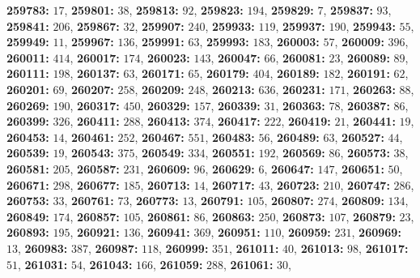 \textsf{\bfseries 259783:} $17$, \textsf{\bfseries 259801:} $38$, \textsf{\bfseries 259813:} $92$, \textsf{\bfseries 259823:} $194$, \textsf{\bfseries 259829:} $7$, \textsf{\bfseries 259837:} $93$, \textsf{\bfseries 259841:} $206$, \textsf{\bfseries 259867:} $32$, \textsf{\bfseries 259907:} $240$, \textsf{\bfseries 259933:} $119$, \textsf{\bfseries 259937:} $190$, \textsf{\bfseries 259943:} $55$, \textsf{\bfseries 259949:} $11$, \textsf{\bfseries 259967:} $136$, \textsf{\bfseries 259991:} $63$, \textsf{\bfseries 259993:} $183$, \textsf{\bfseries 260003:} $57$, \textsf{\bfseries 260009:} $396$, \textsf{\bfseries 260011:} $414$, \textsf{\bfseries 260017:} $174$, \textsf{\bfseries 260023:} $143$, \textsf{\bfseries 260047:} $66$, \textsf{\bfseries 260081:} $23$, \textsf{\bfseries 260089:} $89$, \textsf{\bfseries 260111:} $198$, \textsf{\bfseries 260137:} $63$, \textsf{\bfseries 260171:} $65$, \textsf{\bfseries 260179:} $404$, \textsf{\bfseries 260189:} $182$, \textsf{\bfseries 260191:} $62$, \textsf{\bfseries 260201:} $69$, \textsf{\bfseries 260207:} $258$, \textsf{\bfseries 260209:} $248$, \textsf{\bfseries 260213:} $636$, \textsf{\bfseries 260231:} $171$, \textsf{\bfseries 260263:} $88$, \textsf{\bfseries 260269:} $190$, \textsf{\bfseries 260317:} $450$, \textsf{\bfseries 260329:} $157$, \textsf{\bfseries 260339:} $31$, \textsf{\bfseries 260363:} $78$, \textsf{\bfseries 260387:} $86$, \textsf{\bfseries 260399:} $326$, \textsf{\bfseries 260411:} $288$, \textsf{\bfseries 260413:} $374$, \textsf{\bfseries 260417:} $222$, \textsf{\bfseries 260419:} $21$, \textsf{\bfseries 260441:} $19$, \textsf{\bfseries 260453:} $14$, \textsf{\bfseries 260461:} $252$, \textsf{\bfseries 260467:} $551$, \textsf{\bfseries 260483:} $56$, \textsf{\bfseries 260489:} $63$, \textsf{\bfseries 260527:} $44$, \textsf{\bfseries 260539:} $19$, \textsf{\bfseries 260543:} $375$, \textsf{\bfseries 260549:} $334$, \textsf{\bfseries 260551:} $192$, \textsf{\bfseries 260569:} $86$, \textsf{\bfseries 260573:} $38$, \textsf{\bfseries 260581:} $205$, \textsf{\bfseries 260587:} $231$, \textsf{\bfseries 260609:} $96$, \textsf{\bfseries 260629:} $6$, \textsf{\bfseries 260647:} $147$, \textsf{\bfseries 260651:} $50$, \textsf{\bfseries 260671:} $298$, \textsf{\bfseries 260677:} $185$, \textsf{\bfseries 260713:} $14$, \textsf{\bfseries 260717:} $43$, \textsf{\bfseries 260723:} $210$, \textsf{\bfseries 260747:} $286$, \textsf{\bfseries 260753:} $33$, \textsf{\bfseries 260761:} $73$, \textsf{\bfseries 260773:} $13$, \textsf{\bfseries 260791:} $105$, \textsf{\bfseries 260807:} $274$, \textsf{\bfseries 260809:} $134$, \textsf{\bfseries 260849:} $174$, \textsf{\bfseries 260857:} $105$, \textsf{\bfseries 260861:} $86$, \textsf{\bfseries 260863:} $250$, \textsf{\bfseries 260873:} $107$, \textsf{\bfseries 260879:} $23$, \textsf{\bfseries 260893:} $195$, \textsf{\bfseries 260921:} $136$, \textsf{\bfseries 260941:} $369$, \textsf{\bfseries 260951:} $110$, \textsf{\bfseries 260959:} $231$, \textsf{\bfseries 260969:} $13$, \textsf{\bfseries 260983:} $387$, \textsf{\bfseries 260987:} $118$, \textsf{\bfseries 260999:} $351$, \textsf{\bfseries 261011:} $40$, \textsf{\bfseries 261013:} $98$, \textsf{\bfseries 261017:} $51$, \textsf{\bfseries 261031:} $54$, \textsf{\bfseries 261043:} $166$, \textsf{\bfseries 261059:} $288$, \textsf{\bfseries 261061:} $30$, 
